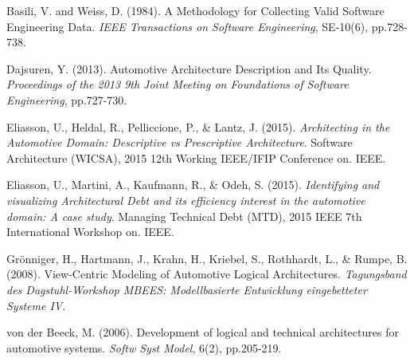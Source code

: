 \begin{thebibliography}{69}

Basili, V. and Weiss, D. (1984). A Methodology for Collecting Valid Software Engineering Data. \textit{IEEE Transactions on Software Engineering}, SE-10(6), pp.728-738.

Dajsuren, Y. (2013). Automotive Architecture Description and Its Quality. \textit{Proceedings of the 2013 9th Joint Meeting on Foundations of Software Engineering}, pp.727-730. 

Eliasson, U., Heldal, R., Pelliccione, P., \& Lantz, J. (2015). \textit{Architecting in the Automotive Domain: Descriptive vs Prescriptive Architecture}. Software Architecture (WICSA), 2015 12th Working IEEE/IFIP Conference on. IEEE.

Eliasson, U., Martini, A., Kaufmann, R., \& Odeh, S. (2015). \textit{Identifying and visualizing Architectural Debt and its efficiency interest in the automotive domain: A case study}. Managing Technical Debt (MTD), 2015 IEEE 7th International Workshop on. IEEE.

Grönniger, H., Hartmann, J., Krahn, H., Kriebel, S., Rothhardt, L., \& Rumpe, B. (2008). View-Centric Modeling of Automotive Logical Architectures. \textit{Tagungsband des Dagstuhl-Workshop MBEES: Modellbasierte Entwicklung eingebetteter Systeme IV}.

von der Beeck, M. (2006). Development of logical and technical architectures for automotive systems. \textit{Softw Syst Model}, 6(2), pp.205-219.

\end{thebibliography}
